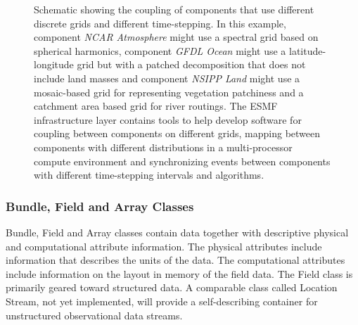 \begin{figure}
\caption{Schematic showing the coupling of components that use different discrete grids and different time-stepping. 
In this example, component {\it NCAR Atmosphere} might use a spectral grid based on spherical harmonics, component
{\it GFDL Ocean} might use a latitude-longitude grid but with a patched decomposition that does not include
land masses and component {\it NSIPP Land} might use a mosaic-based grid for representing vegetation patchiness
and a catchment area based grid for river routings. The ESMF infrastructure layer contains tools to help develop 
software for coupling between components on different grids, mapping between components with different distributions in a 
multi-processor compute environment and synchronizing events between components with different time-stepping intervals 
and algorithms.  }
\label{fig:threecomponents}
\end{figure}

\subsubsection{Bundle, Field and Array Classes}
Bundle, Field and Array classes contain data together with descriptive
physical and computational attribute information. The physical attributes include information that describes the units
of the data. The computational attributes include information on the layout in memory of the field data. The Field class
is primarily geared toward structured data. A comparable class called Location Stream, not yet implemented, will provide a self-describing
container for unstructured observational data streams.


